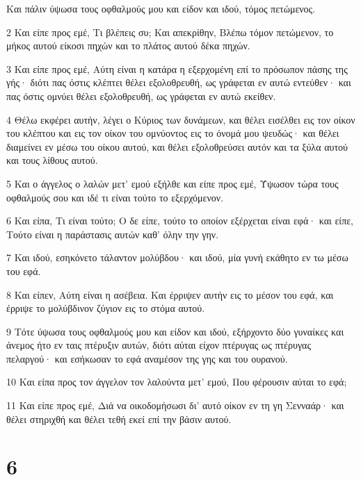 \par Και πάλιν ύψωσα τους οφθαλμούς μου και είδον και ιδού, τόμος πετώμενος.
\par 2 Και είπε προς εμέ, Τι βλέπεις συ; Και απεκρίθην, Βλέπω τόμον πετώμενον, το μήκος αυτού είκοσι πηχών και το πλάτος αυτού δέκα πηχών.
\par 3 Και είπε προς εμέ, Αύτη είναι η κατάρα η εξερχομένη επί το πρόσωπον πάσης της γής· διότι πας όστις κλέπτει θέλει εξολοθρευθή, ως γράφεται εν αυτώ εντεύθεν· και πας όστις ομνύει θέλει εξολοθρευθή, ως γράφεται εν αυτώ εκείθεν.
\par 4 Θέλω εκφέρει αυτήν, λέγει ο Κύριος των δυνάμεων, και θέλει εισέλθει εις τον οίκον του κλέπτου και εις τον οίκον του ομνύοντος εις το όνομά μου ψευδώς· και θέλει διαμείνει εν μέσω του οίκου αυτού, και θέλει εξολοθρεύσει αυτόν και τα ξύλα αυτού και τους λίθους αυτού.
\par 5 Και ο άγγελος ο λαλών μετ' εμού εξήλθε και είπε προς εμέ, Ύψωσον τώρα τους οφθαλμούς σου και ιδέ τι είναι τούτο το εξερχόμενον.
\par 6 Και είπα, Τι είναι τούτο; Ο δε είπε, τούτο το οποίον εξέρχεται είναι εφά· και είπε, Τούτο είναι η παράστασις αυτών καθ' όλην την γην.
\par 7 Και ιδού, εσηκόνετο τάλαντον μολύβδου· και ιδού, μία γυνή εκάθητο εν τω μέσω του εφά.
\par 8 Και είπεν, Αύτη είναι η ασέβεια. Και έρριψεν αυτήν εις το μέσον του εφά, και έρριψε το μολύβδινον ζύγιον εις το στόμα αυτού.
\par 9 Τότε ύψωσα τους οφθαλμούς μου και είδον και ιδού, εξήρχοντο δύο γυναίκες και άνεμος ήτο εν ταις πτέρυξιν αυτών, διότι αύται είχον πτέρυγας ως πτέρυγας πελαργού· και εσήκωσαν το εφά αναμέσον της γης και του ουρανού.
\par 10 Και είπα προς τον άγγελον τον λαλούντα μετ' εμού, Που φέρουσιν αύται το εφά;
\par 11 Και είπε προς εμέ, Διά να οικοδομήσωσι δι' αυτό οίκον εν τη γη Σενναάρ· και θέλει στηριχθή και θέλει τεθή εκεί επί την βάσιν αυτού.

\chapter{6}

